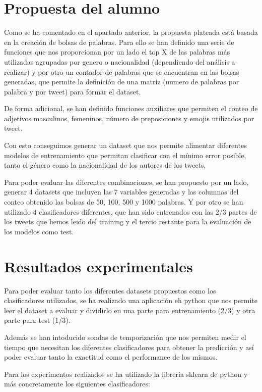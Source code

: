 \documentclass[11pt,a4paper]{article}
\begin{document}
\section{Propuesta del alumno}

Como se ha comentado en el apartado anterior, la propuesta plateada está basada en la creación de bolsas de palabras. Para ello se han definido una serie de funciones que nos proporcionan por un lado el top X de las palabras más utilizadas agrupadas por genero o nacionalidad (dependiendo del análisis a realizar) y por otro un contador de palabras que se encuentran en las bolsas generadas, que permite la definición de una matriz (numero de palabras por palabra y por tweet) para formar el dataset.

De forma adicional, se han definido funciones auxiliares que permiten el conteo de adjetivos masculinos, femeninos, número de preposiciones y emojis utilizados por tweet.

Con esto conseguimos generar un dataset que nos permite alimentar diferentes modelos de entrenamiento que permitan clasificar con el mínimo error posible, tanto el género como la nacionalidad de los autores de los tweets.

Para poder evaluar las diferentes combinaciones, se han propuesto por un lado, generar 4 datasets que incluyen las 7 variables generadas y las columnas del conteo obtenido las bolsas de 50, 100, 500 y 1000 palabras. Y por otro se han utilizado 4 clasificadores diferentes, que han sido entrenados con las 2/3 partes de los tweets que hemos leido del training y el tercio restante para la evaluación de los modelos como test.

\section{Resultados experimentales}

Para poder evaluar tanto los diferentes datasets propuestos como los clasificadores utilizados, se ha realizado una aplicación eh python que nos permite leer el dataset a evaluar y dividirlo en una parte para entrenamiento (2/3) y otra parte para test (1/3).

Además se han intoducido sondas de temporización que nos permiten medir el tiempo que necesitan los diferentes clasificadores para obtener la predicción y así poder evaluar tanto la exactitud como el performance de los mismos.

Para los experimentos realizados se ha utilizado la libreria sklearn de python y más concretamente los siguientes clasificadores:
\end{document}
